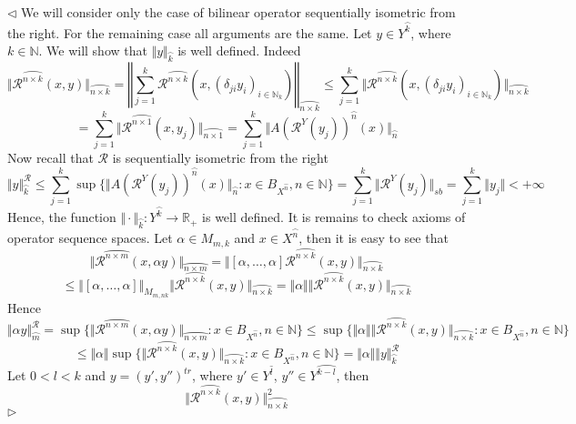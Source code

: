 \documentclass[12pt]{article}
\newenvironment{proof}{\par $\triangleleft$}{$\triangleright$}
\begin{document}
\begin{proof}
We will consider only the case of bilinear operator sequentially isometric from the right. For the remaining case all arguments are the same. Let $y\in Y^{\wideparen{k}}$, where $k\in\mathbb{N}$. We will show that $\Vert y\Vert_{\wideparen{k}}$ is well defined. Indeed
$$
\Vert\mathcal{R}^{\wideparen{n\times k}}(x,y)\Vert_{\wideparen{n\times k}}
=\left\Vert\sum\limits_{j=1}^k\mathcal{R}^{\wideparen{n\times k}}(x,(\delta_{ji}y_i)_{i\in\mathbb{N}_k})\right\Vert_{\wideparen{n\times k}}
\leq\sum\limits_{j=1}^k\Vert\mathcal{R}^{\wideparen{n\times k}}(x,(\delta_{ji}y_i)_{i\in\mathbb{N}_k})\Vert_{\wideparen{n\times k}}
$$
$$
=\sum\limits_{j=1}^k\Vert\mathcal{R}^{\wideparen{n\times 1}}(x,y_j)\Vert_{\wideparen{n\times 1}}
=\sum\limits_{j=1}^k\Vert A(\mathcal{R}^Y(y_j))^{\wideparen{n}}(x)\Vert_{\wideparen{n}}
$$
Now recall that $\mathcal{R}$ is sequentially isometric from the right
$$
\Vert y\Vert_{\wideparen{k}}^{\mathcal{R}}
\leq\sum\limits_{j=1}^k\sup\{\Vert A(\mathcal{R}^Y(y_j))^{\wideparen{n}}(x)\Vert_{\wideparen{n}}:x\in B_{X^{\wideparen{n}}}, n\in\mathbb{N}\}
=\sum\limits_{j=1}^k \Vert\mathcal{R}^Y(y_j)\Vert_{sb}
=\sum\limits_{j=1}^k \Vert y_j\Vert<+\infty
$$
Hence, the function $\Vert\cdot\Vert_{\wideparen{k}}:Y^{\wideparen{k}}\to\mathbb{R}_+$ is well defined. It is remains to check axioms of operator sequence spaces. Let $\alpha\in M_{m,k}$ and $x\in X^{\wideparen{n}}$, then it is easy to see that
$$
\Vert\mathcal{R}^{\wideparen{n\times m}}(x,\alpha y)\Vert_{\wideparen{n\times m}}
=\Vert[\alpha,\ldots,\alpha]\mathcal{R}^{\wideparen{n\times k}}(x,y)\Vert_{\wideparen{n\times k}}
$$
$$
\leq\Vert[\alpha,\ldots,\alpha]\Vert_{M_{m,nk}}\Vert\mathcal{R}^{\wideparen{n\times k}}(x,y)\Vert_{\wideparen{n\times k}}
=\Vert\alpha\Vert\Vert\mathcal{R}^{\wideparen{n\times k}}(x,y)\Vert_{\wideparen{n\times k}}
$$
Hence
$$
\Vert\alpha y\Vert_{\wideparen{m}}^{\mathcal{R}}
=\sup\{\Vert\mathcal{R}^{\wideparen{n\times m}}(x,\alpha y)\Vert_{\wideparen{n\times m}}:x\in B_{X^{\wideparen{n}}},n\in\mathbb{N}\}
\leq\sup\{\Vert\alpha\Vert\Vert\mathcal{R}^{\wideparen{n\times k}}(x,y)\Vert_{\wideparen{n\times k}}:x\in B_{X^{\wideparen{n}}},n\in\mathbb{N}\}
$$
$$
\leq\Vert\alpha\Vert\sup\{\Vert\mathcal{R}^{\wideparen{n\times k}}(x,y)\Vert_{\wideparen{n\times k}}:x\in B_{X^{\wideparen{n}}},n\in\mathbb{N}\}
=\Vert\alpha\Vert\Vert y\Vert_{\wideparen{k}}^{\mathcal{R}}
$$
Let $0<l<k$ and $y=(y', y'')^{tr}$, where $y'\in Y^{\wideparen{l}}$, $y''\in Y^{\wideparen{k-l}}$, then
$$
\Vert \mathcal{R}^{\wideparen{n\times k}}(x,y)\Vert_{\wideparen{n\times k}}^2
$$
\end{proof}
\end{document}

